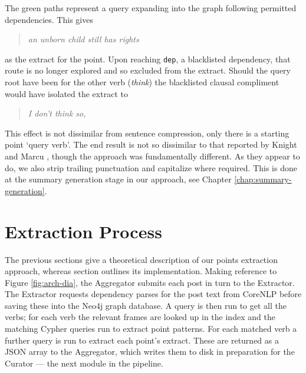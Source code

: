     The green paths represent a query expanding into the graph following permitted dependencies. This gives \blockquote{\textit{an unborn child still has rights}} as the extract for the point. Upon reaching \texttt{dep}, a blacklisted dependency, that route is no longer explored and so excluded from the extract. Should the query root have been for the other verb (\textit{think}) the blacklisted clausal compliment would have isolated the extract to \blockquote{\textit{I don't think so,}}.

    This effect is not dissimilar from sentence compression, only there is a starting point `query verb'. The end result is not so dissimilar to that reported by Knight and Marcu \cite{knight2000statistics}, though the approach was fundamentally different. As they appear to do, we also strip trailing punctuation and capitalize where required. This is done at the summary generation stage in our approach, see Chapter \ref{chap:summary-generation}.

  \section{Extraction Process}
    The previous sections give a theoretical description of our points extraction approach, whereas section outlines its implementation. Making reference to Figure \ref{fig:arch-dia}, the Aggregator submits each post in turn to the Extractor. The Extractor requests dependency parses for the post text from CoreNLP before saving these into the Neo4j graph database. A query is then run to get all the verbs; for each verb the relevant frames are looked up in the index and the matching Cypher queries run to extract point patterns. For each matched verb a further query is run to extract each point's extract. These are returned as a JSON array to the Aggregator, which writes them to disk in preparation for the Curator --- the next module in the pipeline.
